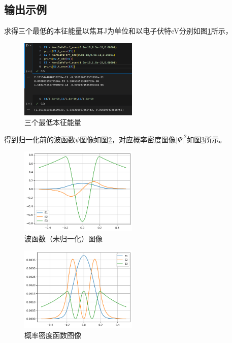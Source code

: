 \documentclass[11pt]{article}
\begin{document}
\subsection{输出示例}
求得三个最低的本征能量以焦耳J为单位和以电子伏特eV分别如图\ref{fig:三个最低本征能量}所示，
\begin{figure}
    \centering
    \includegraphics[width=0.5\textwidth]{三个最低本征能量.png}
    \caption{三个最低本征能量}
    \label{fig:三个最低本征能量}
\end{figure}
得到归一化前的波函数$\psi$图像如图\ref{fig:波函数（未归一化）图像}，对应概率密度图像$|\Psi|^2$如图\ref{fig:概率密度函数图像}所示。
\begin{figure}
    \centering
    \includegraphics[width=0.5\textwidth]{波函数（未归一化）图像.png}
    \caption{波函数（未归一化）图像}
    \label{fig:波函数（未归一化）图像}
\end{figure}
\begin{figure}
    \centering
    \includegraphics[width=0.5\textwidth]{概率密度函数图像.png}
    \caption{概率密度函数图像}
    \label{fig:概率密度函数图像}
\end{figure}
\end{document}
